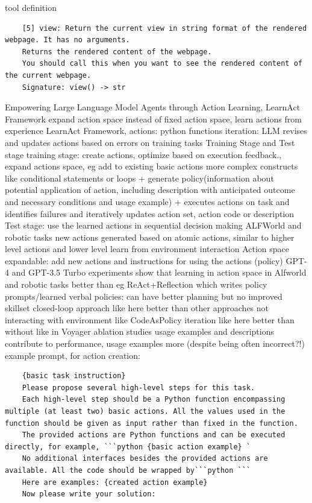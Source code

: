 \documentclass{article}
\begin{document}
tool definition
\begin{verbatim}
	[5] view: Return the current view in string format of the rendered webpage. It has no arguments. 
	Returns the rendered content of the webpage. 
	You should call this when you want to see the rendered content of the current webpage. 
	Signature: view() -> str
\end{verbatim}

\cite{zhao_empowering_2024} Empowering Large Language Model Agents through Action Learning, LearnAct Framework
expand action space instead of fixed action space, learn actions from experience
LearnAct Framework, actions: python functions
iteration: LLM revises and updates actions based on errors on training tasks
Training Stage and Test stage
training stage: create actions, optimize based on execution feedback., expand actions space, eg add to existing basic actions more complex constructs like conditional statements or loops + generate policy(information about potential application of action, including description with anticipated outcome and necessary conditions and usage example)
+ executes actions on task and identifies failures and iteratively updates action set, action code or description
Test stage: use the learned actions in sequential decision making
ALFWorld and robotic tasks
new actions generated based on atomic actions, similar to higher level actions and lower level
learn from environment interaction
Action space expandable: add new actions and instructions for using the actions (policy)
GPT-4 and GPT-3.5 Turbo
experiments show that learning in action space in Alfworld and robotic tasks better than eg ReAct+Reflection which writes policy prompts/learned verbal policies: can have better planning but no improved skillset
closed-loop approach like here better than other approaches not interacting with environment like CodeAsPolicy
iteration like here better than without like in Voyager
ablation studies
usage examples and descriptions contribute to performance, usage examples more (despite being often incorrect?!)
example prompt, for action creation:
\begin{verbatim}
	{basic task instruction} 
	Please propose several high-level steps for this task. 
	Each high-level step should be a Python function encompassing multiple (at least two) basic actions. All the values used in the function should be given as input rather than fixed in the function. 
	The provided actions are Python functions and can be executed directly, for example, ```python {basic action example} ` 
	No additional interfaces besides the provided actions are available. All the code should be wrapped by```python ``` 
	Here are examples: {created action example} 
	Now please write your solution:
\end{verbatim}
\end{document}
